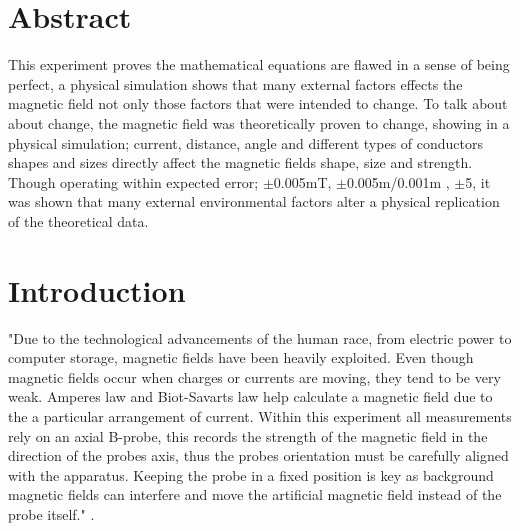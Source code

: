 \documentclass[12pt]{article}
\begin{document}
\newpage
\begin{titlepage}
\begin{tableofcontents}
\end{tableofcontents}
\end{titlepage}
\newpage
\section{Abstract}

This experiment proves the mathematical equations are flawed in a sense of being perfect, a physical simulation shows that many external factors effects the magnetic field not only those factors that were intended to change. To talk about about change, the magnetic field was theoretically proven to change, showing in a physical simulation; current, distance, angle and different types of conductors shapes and sizes directly affect the magnetic fields shape, size and strength. Though operating within expected error; $\pm$0.005mT, $\pm$0.005m/0.001m , $\pm$5\textdegree, it was shown that many external environmental factors alter a physical replication of the theoretical data.

\section{Introduction}

"Due to the technological advancements of the human race, from electric power to computer storage, magnetic fields have been heavily exploited. Even though magnetic fields occur when charges or currents are moving, they tend to be very weak. Amperes law and Biot-Savarts law help calculate a magnetic field due to the a particular arrangement of current. Within this experiment all measurements rely on an axial B-probe, this records the strength of the magnetic field in the direction of the probes axis, thus the probes orientation must be carefully aligned with the apparatus. Keeping the probe in a fixed position is key as background magnetic fields can interfere and move the artificial magnetic field instead of the probe itself." \cite{Exp.5-2019}\cite{Exp.5-Lab_book}. \\
\end{document}
